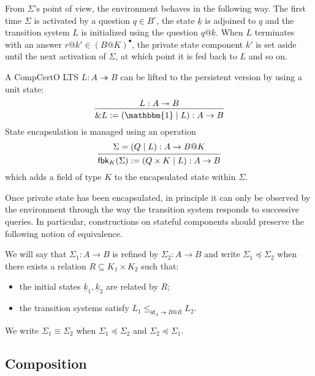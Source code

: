 \documentclass[acmsmall,screen,review,anonymous]{acmart}
\newcommand{\kw}[1]{\ensuremath{ \mathsf{#1} }}
\newcommand{\que}{\circ}
\newcommand{\ans}{\bullet}
\renewcommand{\preceq}{\preccurlyeq}
\newcommand{\intl}[1]{\underline{#1}}
\begin{document}
From $\Sigma$'s point of view,
the environment behaves in the following way.
The first time $\Sigma$ is activated by a question $q \in B^\que$,
the state $\intl{k}$ is adjoined to $q$
and the transition system $L$ is initialized using the question $q@\intl{k}$.
When $L$ terminates with an answer $r@k' \in (B@K)^\ans$,
the private state component $k'$
is set aside until
the next activation of $\Sigma$,
at which point it is fed back to $L$ and so on.

A CompCertO LTS $L : A \twoheadrightarrow B$
can be lifted to the persistent version
by using a unit state:
\[
  \begin{prooftree}
    \hypo{L : A \twoheadrightarrow B}
    \infer1{\&L := (\mathbbm{1} \mid L) : A \rightarrow B}
  \end{prooftree}
\]
State encapsulation is managed using an operation
\[
  \begin{prooftree}
    \hypo{\Sigma = (Q \mid L) : A \rightarrow B@K}
    \infer1{\mathsf{fbk}_K(\Sigma) := (Q \times K \mid L) : A \rightarrow B}
  \end{prooftree}
\]
which adds a field of type $K$ to the encapsulated state within $\Sigma$.

Once private state has been encapsulated,
in principle it can only be observed by the environment
through the way the transition system responds
to successive queries.
In particular,
constructions on stateful components
should preserve the following notion of equivalence.

\begin{definition} \label{def:ssim}
We will say that $\Sigma_1 : A \rightarrow B$
is refined by $\Sigma_2 : A \rightarrow B$
and write $\Sigma_1 \preceq \Sigma_2$
when there exists a relation $R \subseteq K_1 \times K_2$
such that:
\begin{itemize}
  \item the initial states $\intl{k}_1, \intl{k}_2$ are related by $R$;
  \item the transition systems satisfy
    $L_1 \le_{\kw{id}_A \twoheadrightarrow B@R} L_2$.
\end{itemize}
We write $\Sigma_1 \equiv \Sigma_2$ when
$\Sigma_1 \preceq \Sigma_2$ and
$\Sigma_2 \preceq \Sigma_1$.
\end{definition}


\subsection{Composition} %
\end{document}
